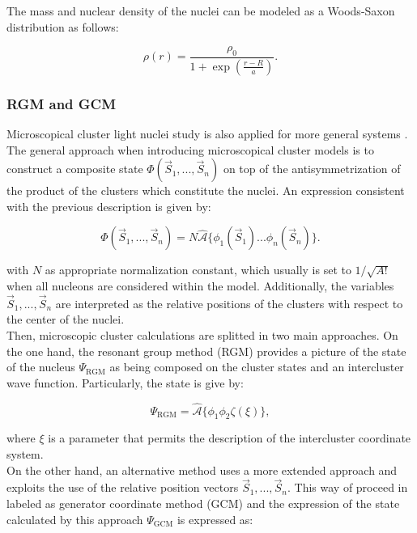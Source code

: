 \documentclass[openany]{book}
\begin{document}
The mass and nuclear density of the nuclei can be modeled as a Woods-Saxon distribution as follows:

\begin{equation} \label{eq:micro_density}
	\rho(r) = \frac{\rho_0}{1 + \exp{\left(\frac{r - R}{a}\right)}}.
\end{equation} 


\subsubsection{RGM and GCM } \label{ssub:micro_RGM_GCM}

Microscopical cluster light nuclei study is also applied for more general systems \cite{freer_horiuchi_kanada-enyo_lee_meisner_2018}. The general approach when introducing microscopical cluster models is to construct a composite state $\Phi(\vec S_1, ..., \vec S_n)$ on top of the antisymmetrization of the product of the clusters which constitute the nuclei. An expression consistent with the previous description is given by:

\begin{equation}\label{eq:micro_cluster_generalizedWaveFunction}
	\Phi(\vec S_1, ..., \vec S_n)  = N \hat {\mathcal {A}} \{ \phi_1 (\vec S_1) ...  \phi_n (\vec S_n)\}.
\end{equation}

with $N$ as appropriate normalization constant, which usually is set to $1/\sqrt{A!}$ when all nucleons are considered within the model. Additionally, the variables $\vec S_1, ..., \vec S_n$ are interpreted as the relative positions of the clusters with respect to the center of the nuclei.  \\

Then, microscopic cluster calculations are splitted in two main approaches. On the one hand,  the resonant group method (RGM) provides a picture of the state of the nucleus $	\Psi_{\mathrm{RGM}}$ as being composed on the cluster states and an intercluster wave function. Particularly, the state is give by:

\begin{equation}\label{eq:micro_cluster_RGM_waveFunction}
	\Psi_{\mathrm{RGM}} =  \hat {\mathcal{A}} \{\phi_1 \phi_2 \zeta (\xi) \},
\end{equation}

where $\xi$ is a parameter that permits the description of the intercluster coordinate system. \\

On the other hand, an alternative method uses a more extended approach and exploits the use of the relative position vectors $\vec S_1, ..., \vec S_n$. This way of proceed in labeled as generator coordinate method  (GCM) and the expression of the state calculated by this approach $	\Psi_{\mathrm{GCM}}$ is expressed as: 
\end{document}
